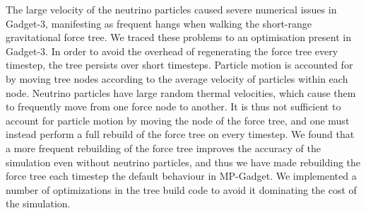\documentclass[useAMS, usenatbib]{mnras}
\begin{document}
The large velocity of the neutrino particles caused severe numerical issues in Gadget-3, manifesting as frequent hangs when walking the short-range gravitational force tree. We traced these problems to an optimisation present in Gadget-3. In order to avoid the overhead of regenerating the force tree every timestep, the tree persists over short timesteps. Particle motion is accounted for by moving tree nodes according to the average velocity of particles within each node. Neutrino particles have large random thermal velocities, which cause them to frequently move from one force node to another. It is thus not sufficient to account for particle motion by moving the node of the force tree, and one must instead perform a full rebuild of the force tree on every timestep. We found that a more frequent rebuilding of the force tree improves the accuracy of the simulation even without neutrino particles, and thus we have made rebuilding the force tree each timestep the default behaviour in MP-Gadget. We implemented a number of optimizations in the tree build code to avoid it dominating the cost of the simulation.
\end{document}
